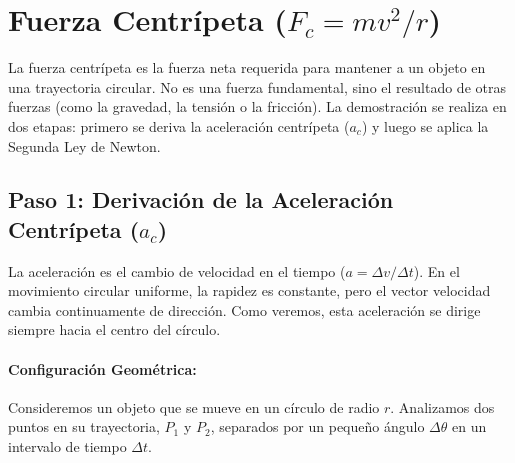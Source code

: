 \documentclass[11pt,a4paper]{book}
\begin{document}



\section{Fuerza Centrípeta ($F_c = mv^2/r$)}

La fuerza centrípeta es la fuerza neta requerida para mantener a un objeto en una trayectoria circular. No es una fuerza fundamental, sino el resultado de otras fuerzas (como la gravedad, la tensión o la fricción). La demostración se realiza en dos etapas: primero se deriva la aceleración centrípeta ($a_c$) y luego se aplica la Segunda Ley de Newton.

\subsection{Paso 1: Derivación de la Aceleración Centrípeta ($a_c$)}

La aceleración es el cambio de velocidad en el tiempo ($a = \Delta v / \Delta t$). En el movimiento circular uniforme, la rapidez es constante, pero el vector velocidad cambia continuamente de dirección. Como veremos, esta aceleración se dirige siempre hacia el centro del círculo.

\paragraph{Configuración Geométrica:}
Consideremos un objeto que se mueve en un círculo de radio $r$. Analizamos dos puntos en su trayectoria, $P_1$ y $P_2$, separados por un pequeño ángulo $\Delta \theta$ en un intervalo de tiempo $\Delta t$.
\end{document}
